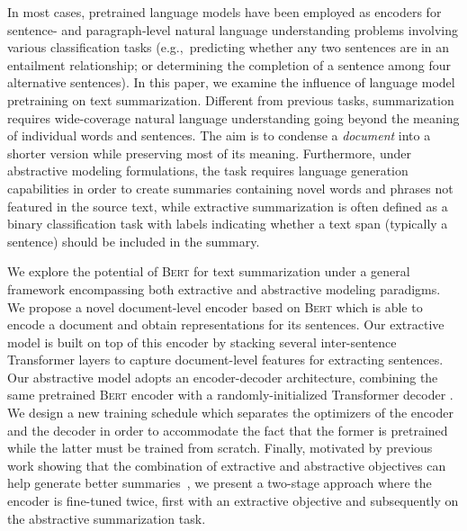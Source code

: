 \documentclass[11pt,a4paper]{article}
\begin{document}
    In most cases, pretrained language models have been employed as
    encoders for sentence- and paragraph-level natural language
    understanding problems \cite{devlin2018bert} involving various
    classification tasks (e.g.,~predicting whether any two sentences are
    in an entailment relationship; or determining the completion of a
    sentence among four alternative sentences).  
    In this paper, we examine
    the influence of language model pretraining on text
    summarization. Different from previous tasks, summarization requires
    wide-coverage natural language understanding going beyond the meaning
    of individual words and sentences. 
    The aim is to condense a
    \emph{document} into a shorter version while preserving most of its
    meaning. Furthermore, under abstractive modeling formulations, the task
    requires language generation capabilities in order to create summaries
    containing novel words and phrases not featured in the source text, while extractive summarization is often defined as a binary
    classification task with labels indicating whether a text span
    (typically a sentence) should be included in the summary.
    
    
    We explore the potential of \textsc{Bert} for text summarization under
    a general framework encompassing both extractive and abstractive
    modeling paradigms.  We propose a novel document-level encoder based
    on \textsc{Bert} which is able to encode a document and obtain
    representations for its sentences. Our extractive model is built on
    top of this encoder by stacking several inter-sentence Transformer
    layers to capture document-level features for extracting sentences.
    Our abstractive model adopts an encoder-decoder architecture,
    combining the same pretrained \textsc{Bert} encoder with a
    randomly-initialized Transformer decoder
    \cite{vaswani2017attention}. We design a new training schedule which
    separates the optimizers of the encoder and the decoder in order to
    accommodate the fact that the former is pretrained while the latter
    must be trained from scratch.  Finally, motivated by previous work
    showing that the combination of extractive and abstractive objectives
    can help generate better summaries~\cite{gehrmann2018bottom}, we
    present a two-stage approach where the encoder is fine-tuned twice,
    first with an extractive objective and subsequently on the abstractive
    summarization task.
    
    
\end{document}
